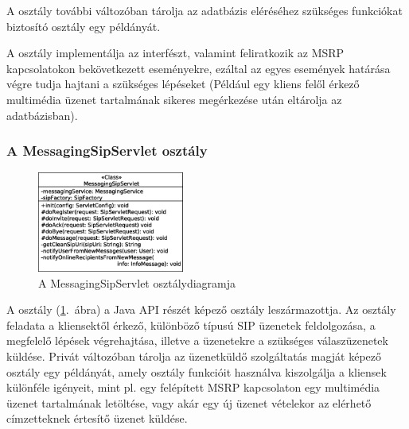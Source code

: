 A  osztály további változóban tárolja az adatbázis eléréséhez szükséges funkciókat biztosító  osztály egy példányát. 

A  osztály implementálja az  interfészt, valamint feliratkozik az MSRP kapcsolatokon bekövetkezett eseményekre, ezáltal az egyes események határása végre tudja hajtani a szükséges lépéseket (Például egy kliens felől érkező multimédia üzenet tartalmának sikeres megérkezése után eltárolja az adatbázisban).

\newpage

\subsubsection*{A MessagingSipServlet osztály}
\label{sec:server_messagingsipservlet}

\begin{figure}
  \vspace{-15pt}
  \begin{center}
    \includegraphics[width=0.43\textwidth]{img/class_diagrams/server/eps/MessagingSipServlet.eps}
  \end{center}
  \vspace{-15pt}
  \captionsetup{font=scriptsize}
  \caption{A MessagingSipServlet osztálydiagramja}
   \label{fig:class_server_messagingsipservlet}
  \vspace{-10pt}
\end{figure}

A  osztály (\ref{fig:class_server_messagingsipservlet}.~ábra) a Java API részét képező  osztály leszármazottja. Az osztály feladata a kliensektől érkező, különböző típusú SIP üzenetek feldolgozása, a megfelelő lépések végrehajtása, illetve a üzenetekre a szükséges válaszüzenetek küldése. Privát változóban tárolja az üzenetküldő szolgáltatás magját képező  osztály egy példányát, amely osztály funkcióit használva kiszolgálja a kliensek különféle igényeit, mint pl. egy felépített MSRP kapcsolaton egy multimédia üzenet tartalmának letöltése, vagy akár egy új üzenet vételekor az elérhető címzetteknek értesítő üzenet küldése.

